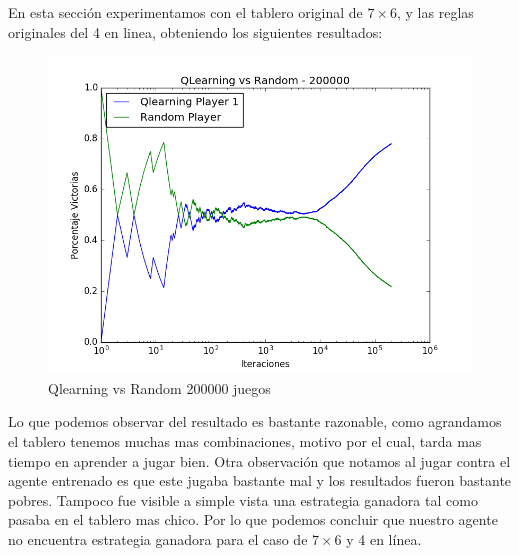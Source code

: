 En esta sección experimentamos con el tablero original de $7\times6$, y las reglas originales del 4 en linea, obteniendo los siguientes resultados:\\







\begin{figure}[H]
 \centering
  \begin{minipage}[c]{\textwidth}
	\centering
	\includegraphics[scale=0.5]{resultados/7x6/QlearningVsRandom_200000_7x6_parametros_informe.png}
        \caption{Qlearning vs Random 200000 juegos}
  \end{minipage}
\end{figure}

Lo que podemos observar del resultado es bastante razonable, como agrandamos el tablero tenemos muchas mas combinaciones, motivo por el cual, tarda mas tiempo en aprender a jugar bien.
Otra observación que notamos al jugar contra el agente entrenado es que este jugaba bastante mal y los resultados fueron bastante pobres. Tampoco fue visible a simple vista una estrategia ganadora tal como pasaba en el tablero mas chico.
Por lo que podemos concluir que nuestro agente no encuentra estrategia ganadora para el caso de $7\times6$ y 4 en línea.


